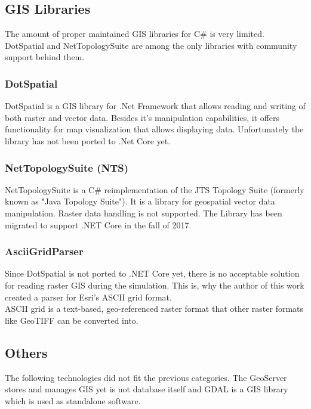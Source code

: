 \subsection{GIS Libraries}
The amount of proper maintained GIS libraries for C\# is very limited. DotSpatial and NetTopologySuite are among the only libraries with community support behind them.

\subsubsection{DotSpatial}
DotSpatial is a GIS library for .Net Framework that allows reading and writing of both raster and vector data. Besides it's manipulation capabilities, it offers functionality for map visualization that allows displaying data. Unfortunately the library has not been ported to .Net Core yet.

\subsubsection{NetTopologySuite (NTS)}
NetTopologySuite is a C\# reimplementation of the JTS Topology Suite (formerly known as "Java Topology Suite"). It is a library for geospatial vector data manipulation. Raster data handling is not supported. The Library has been migrated to support .NET Core in the fall of 2017.

\subsubsection{AsciiGridParser}
Since DotSpatial is not ported to .NET Core yet, there is no acceptable solution for reading raster GIS during the simulation. This is, why the author of this work created a parser for Esri's ASCII grid format.\\
ASCII grid is a text-based, geo-referenced raster format that other raster formats like GeoTIFF can be converted into.


\subsection{Others}
The following technologies did not fit the previous categories. The GeoServer stores and manages GIS yet is not database itself and GDAL is a GIS library which is used as standalone software.

